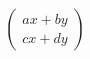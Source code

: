 \documentclass[preview]{standalone}
\begin{document}
\begin{align*}
\begin{pmatrix} a x + b y \\ c x + d y \end{pmatrix}
\end{align*}
\end{document}
